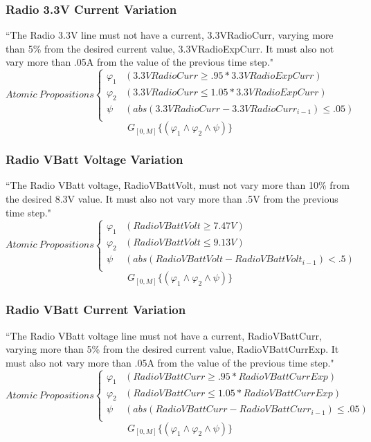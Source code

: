 \documentclass[conf]{new-aiaa}
\begin{document}
\subsubsection{\textbf{Radio 3.3V Current Variation}}
\label{}
“The Radio 3.3V line must not have a current, 3.3VRadioCurr, varying more than 5\% from
the desired current value, 3.3VRadioExpCurr. It must also not vary more than .05A from the value of the previous time step."
\[ Atomic\:Propositions \begin{cases}
  \varphi_1 & (3.3VRadioCurr \geq .95*3.3VRadioExpCurr) \\
  \varphi_2 & (3.3VRadioCurr \leq 1.05*3.3VRadioExpCurr) \\
  \psi & (abs(3.3VRadioCurr - 3.3VRadioCurr_{i-1}) \leq .05)\\
\end{cases} \]
\begin{equation}
    \label{Spec 8}
    G_{[0,M]} \{(\varphi_1 \wedge \varphi_2 \wedge \psi)\}
\end{equation} 

\subsubsection{\textbf{Radio VBatt Voltage Variation}}
\label{}
“The Radio VBatt voltage, RadioVBattVolt, must not vary more than 10\% from the desired 8.3V value. It must also not vary more than .5V from the previous time step."
\[ Atomic\:Propositions \begin{cases}
  \varphi_1 & (RadioVBattVolt \geq 7.47V) \\
  \varphi_2 & (RadioVBattVolt \leq 9.13V) \\
  \psi & (abs(RadioVBattVolt - RadioVBattVolt_{i-1}) < .5)\\
\end{cases} \]
\begin{equation}
    \label{Spec 9}
    G_{[0,M]} \{(\varphi_1 \wedge \varphi_2 \wedge \psi)\}
\end{equation} 

\subsubsection{\textbf{Radio VBatt Current Variation}}
“The Radio VBatt voltage line must not have a current, RadioVBattCurr, varying more than 5\% from the desired current value, RadioVBattCurrExp. It must also not vary more than .05A from the value of the previous time step."
\[ Atomic\:Propositions \begin{cases}
  \varphi_1 & (RadioVBattCurr \geq .95*RadioVBattCurrExp) \\
  \varphi_2 & (RadioVBattCurr \leq 1.05*RadioVBattCurrExp) \\
  \psi & (abs(RadioVBattCurr - RadioVBattCurr_{i-1}) \leq .05)\\
\end{cases} \]
\begin{equation}
    \label{Spec 10}
    G_{[0,M]} \{(\varphi_1 \wedge \varphi_2 \wedge \psi)\}
\end{equation} 
\end{document}
